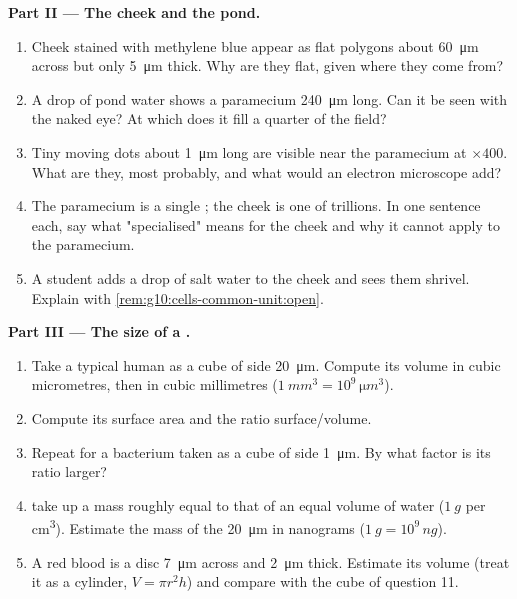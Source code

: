 \begin{problem}
\medskip
\noindent\textbf{Part II --- The cheek and the pond.}
\begin{enumerate}[resume]
  \item Cheek  stained with methylene blue appear as flat
        polygons about \qty{60}{\micro m} across but only
        \qty{5}{\micro m} thick. Why are they flat, given where they
        come from?
  \item A drop of pond water shows a paramecium \qty{240}{\micro m}
        long. Can it be seen with the naked eye? At which
         does it fill a quarter of the field?
  \item Tiny moving dots about \qty{1}{\micro m} long are visible near
        the paramecium at $\times 400$. What are they, most probably,
        and what would an electron microscope add?
  \item The paramecium is a single ; the cheek  is one of
        trillions. In one sentence each, say what "specialised" means
        for the cheek  and why it cannot apply to the paramecium.
  \item A student adds a drop of salt water to the cheek  and sees
        them shrivel. Explain with
        \cref{rem:g10:cells-common-unit:open}.
\end{enumerate}

\medskip
\noindent\textbf{Part III --- The size of a .}
\begin{enumerate}[resume]
  \item Take a typical human  as a cube of side \qty{20}{\micro m}.
        Compute its volume in cubic micrometres, then in cubic
        millimetres ($\qty{1}{mm^3} = 10^9\,\unit{\micro m^3}$).
  \item Compute its surface area and the ratio surface/volume.
  \item Repeat for a bacterium taken as a cube of side
        \qty{1}{\micro m}. By what factor is its ratio larger?
  \item {} take up a mass roughly equal to that of an equal volume
        of water ($\qty{1}{g}$ per \unit{cm^3}). Estimate the mass of
        the \qty{20}{\micro m}  in nanograms
        ($\qty{1}{g} = 10^9\,\unit{ng}$).
  \item A red blood  is a disc \qty{7}{\micro m} across and
        \qty{2}{\micro m} thick. Estimate its volume (treat it as a
        cylinder, $V = \pi r^2 h$) and compare with the cube of
        question 11.
\end{enumerate}


\end{problem}
